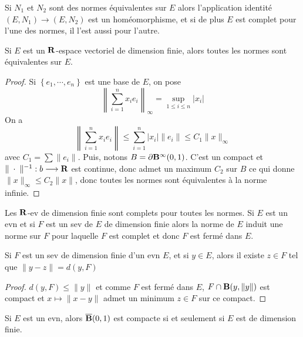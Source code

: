 \begin{rem}
    Si $N_1$ et  $N_2$ sont des normes équivalentes sur $E$ alors l'application identité  $(E, N_1)\longrightarrow (E, N_2)$ est un homéomorphisme, et si de plus $E$ est complet pour l'une des normes, il l'est aussi pour l'autre.
\end{rem}

\begin{thm}
Si $E$ est un  $\mathbf R$-espace vectoriel de dimension finie, alors toutes les normes sont équivalentes sur $E$.
\end{thm}

\begin{proof}
    Si $\left\{ e_1, \cdots , e_n \right\} $ est une base de $E$, on pose  \[
        \left\|\sum_{i=1}^nx_ie_i\right\|_\infty=\sup_{1\leq i\leq n} |x_i|
    \]
    On a \[
    \left\|\sum_{i=1}^nx_ie_i\right\|\leq \sum_{i=1}^n |x_i| \|e_i\|\leq C_1 \|x\|_\infty
    \] 
    avec $C_1=\sum \|e_i\|$. Puis, notons $B=\partial \mathbf B^\infty(0, 1)$. C'est un compact et $\|\;\cdot\;\|^{-1}:b\longrightarrow \mathbf R$ est continue, donc admet un maximum $C_2$ sur $B$ ce qui donne $\|x\|_\infty\leq C_2\|x\|$, donc toutes les normes sont équivalentes à la norme infinie.
\end{proof}

\begin{rem}
Les $\mathbf R$-ev de dimension finie sont complets pour toutes les normes. Si $E$ est un evn et si  $F$ est un sev de  $E$ de dimension finie alors la norme de  $E$ induit une norme sur  $F$ pour laquelle  $F$ est complet et donc  $F$ est fermé dans  $E$.
\end{rem}

\begin{lmm}
    Si $F$ est un sev de dimension finie d'un evn  $E$, et si  $y \in  E$, alors il existe $z \in  F$ tel que $\|y-z\|=d(y,F)$
\end{lmm}

\begin{proof}
    $d(y, F)\leq  \|y\|$ et comme $F$ est fermé dans  $E$,  $F\cap \mathbf B(y, \|y\|)$ est compact et $x\longmapsto  \|x-y\|$ admet un minimum $z \in F$ sur ce compact.
\end{proof}

\begin{thm}
    Si $E$ est un evn, alors  $\overline{\mathbf B}(0,1)$ est compacte si et seulement si $E$ est de dimension finie.
\end{thm}

